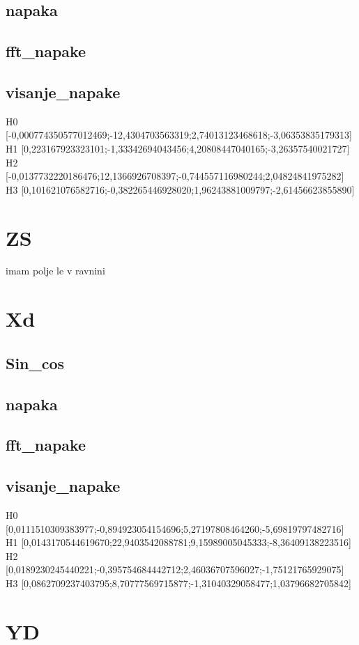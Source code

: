 \subsection{napaka}
\subsection{fft\_napake}
\subsection{visanje\_napake}


H0	[-0,000774350577012469;-12,4304703563319;2,74013123468618;-3,06353835179313]
H1	[0,223167923323101;-1,33342694043456;4,20808447040165;-3,26357540021727]
H2	[-0,0137732220186476;12,1366926708397;-0,744557116980244;2,04824841975282]
H3	[0,101621076582716;-0,382265446928020;1,96243881009797;-2,61456623855890]

\section{ZS}
imam polje le v ravnini
\section{Xd}
\subsection{Sin\_cos}
\subsection{napaka}
\subsection{fft\_napake}
\subsection{visanje\_napake      }  


H0	[0,0111510309383977;-0,894923054154696;5,27197808464260;-5,69819797482716]
H1	[0,0143170544619670;22,9403542088781;9,15989005045333;-8,36409138223516]
H2	[0,0189230245440221;-0,395754684442712;2,46036707596027;-1,75121765929075]
H3	[0,0862709237403795;8,70777569715877;-1,31040329058477;1,03796682705842]

\section{YD}
